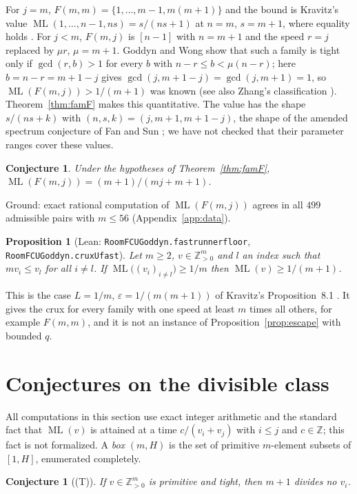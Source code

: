 \documentclass[11pt]{amsart}
\theoremstyle{plain}
\newtheorem{proposition}[theorem]{Proposition}
\newtheorem{conjecture}[theorem]{Conjecture}
\theoremstyle{definition}
\theoremstyle{remark}
\newcommand{\ML}{\operatorname{ML}}
\newcommand{\Z}{\mathbb{Z}}
\newcommand{\lean}[1]{{\def\_{\textunderscore\allowbreak}\def\.{.\allowbreak}\texttt{#1}}}
\begin{document}
For $j=m$, $F(m,m)=\{1,\dots,m-1,m(m+1)\}$ and the bound is Kravitz's value
$\ML(1,\dots,n-1,ns)=s/(ns+1)$ at $n=m$, $s=m+1$, where equality holds \cite[Thm.~5.1]{kravitz}.
For $j<m$, $F(m,j)$ is $[n-1]$ with $n=m+1$ and the speed $r=j$ replaced by $\mu r$,
$\mu=m+1$. Goddyn and Wong \cite[Thm.~2.3]{gw} show that such a family is tight only if
$\gcd(r,b)>1$ for every $b$ with $n-r\le b<\mu(n-r)$; here $b=n-r=m+1-j$ gives
$\gcd(j,m+1-j)=\gcd(j,m+1)=1$, so $\ML(F(m,j))>1/(m+1)$ was known (see also Zhang's
classification \cite[Thm.~1.2]{zhang}). Theorem~\ref{thm:famF} makes this
quantitative. The value has the shape $s/(ns+k)$ with $(n,s,k)=(j,m+1,m+1-j)$, the shape of the
amended spectrum conjecture of Fan and Sun \cite{fansun}; we have not checked that their
parameter ranges cover these values.

\begin{conjecture}\label{conj:Feq}
Under the hypotheses of Theorem~\ref{thm:famF}, $\ML(F(m,j))=(m+1)/(mj+m+1)$.
\end{conjecture}

Ground: exact rational computation of $\ML(F(m,j))$ agrees in all $499$ admissible pairs with
$m\le56$ (Appendix~\ref{app:data}).

\begin{proposition}[Lean: \lean{RoomFCUGoddyn\.fast\_runner\_floor}, \lean{RoomFCUGoddyn\.cruxU\_fast}]\label{prop:fast}
Let $m\ge 2$, $v\in\Z_{>0}^m$ and $l$ an index such that $mv_i\le v_l$ for all $i\ne l$. If
$\ML\big((v_i)_{i\ne l}\big)\ge1/m$ then $\ML(v)\ge1/(m+1)$.
\end{proposition}

This is the case $L=1/m$, $\varepsilon=1/(m(m+1))$ of Kravitz's Proposition~8.1 \cite{kravitz}. It gives the crux for every family with one
speed at least $m$ times all others, for example $F(m,m)$, and it is not an instance of
Proposition~\ref{prop:escape} with bounded $q$.

\section{Conjectures on the divisible class}\label{sec:conj}

All computations in this section use exact integer arithmetic and the standard fact that
$\ML(v)$ is attained at a time $c/(v_i+v_j)$ with $i\le j$ and $c\in\Z$; this fact is not
formalized. A \emph{box} $(m,H)$ is the set of primitive $m$-element subsets of $[1,H]$, enumerated
completely.

\begin{conjecture}[(T)]\label{conj:T}
If $v\in\Z_{>0}^m$ is primitive and tight, then $m+1$ divides no $v_i$.
\end{conjecture}
\end{document}
